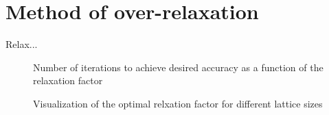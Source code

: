 \documentclass{article}
\begin{document}
\section{Method of over-relaxation}

Relax...

\begin{figure}[H]
  \begin{center}
  \end{center}
  \caption{Number of iterations to achieve desired accuracy as a function of the relaxation factor}
  \label{fig:mag_susc}
\end{figure}

\begin{figure}[H]
  \begin{center}
  \end{center}
  \caption{Visualization of the optimal relxation factor for different lattice sizes}
  \label{fig:mag_susc}
\end{figure}
\end{document}
